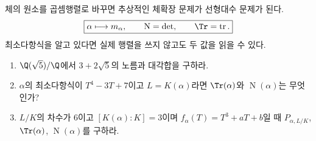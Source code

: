 \begin{keyidea}
체의 원소를 곱셈행렬로 바꾸면 추상적인 체확장 문제가 선형대수 문제가 된다.
\[
  \boxed{
  \alpha\longmapsto m_\alpha,
  \qquad
  \operatorname N=\det,
  \qquad
  \Tr=\operatorname{tr}.}
\]
최소다항식을 알고 있다면 실제 행렬을 쓰지 않고도 두 값을 읽을 수 있다.
\end{keyidea}

\begin{checkpoint}
\begin{enumerate}[label=(\alph*)]
  \item $\Q(\sqrt5)/\Q$에서 $3+2\sqrt5$의 노름과 대각합을 구하라.
  \item $\alpha$의 최소다항식이 $T^4-3T+7$이고 $L=K(\alpha)$라면 $\Tr(\alpha)$와 $\operatorname N(\alpha)$는 무엇인가?
  \item $L/K$의 차수가 $6$이고 $[K(\alpha):K]=3$이며 $f_\alpha(T)=T^3+aT+b$일 때 $P_{\alpha,L/K}$, $\Tr(\alpha)$, $\operatorname N(\alpha)$를 구하라.
\end{enumerate}
\end{checkpoint}
